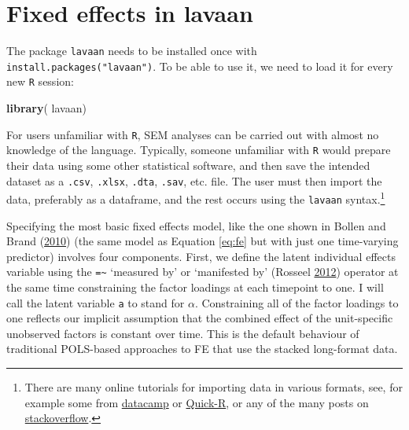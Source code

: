 \documentclass[
  12pt,
  a4paper]{article}
\newenvironment{Shaded}{\begin{snugshade}}{\end{snugshade}}
\newcommand{\KeywordTok}[1]{\textcolor[rgb]{0.13,0.29,0.53}{\textbf{#1}}}
\newcommand{\NormalTok}[1]{#1}
\begin{document}
\hypertarget{fesem}{%
\section{Fixed effects in lavaan}\label{fesem}}

The package \texttt{lavaan} needs to be installed once with
\texttt{install.packages("lavaan")}. To be able to use it, we need to
load it for every new \texttt{R} session:

\singlespacing

\begin{Shaded}
\begin{Highlighting}[]
\KeywordTok{library}\NormalTok{( lavaan)}
\end{Highlighting}
\end{Shaded}

\doublespacing

For users unfamiliar with \texttt{R}, SEM analyses can be carried out
with almost no knowledge of the language. Typically, someone unfamiliar
with \texttt{R} would prepare their data using some other statistical
software, and then save the intended dataset as a \texttt{.csv},
\texttt{.xlsx}, \texttt{.dta}, \texttt{.sav}, etc. file. The user must
then import the data, preferably as a dataframe, and the rest occurs
using the \texttt{lavaan} syntax.\footnote{There are many online
  tutorials for importing data in various formats, see, for example some
  from
  \href{https://www.datacamp.com/community/tutorials/r-data-import-tutorial}{datacamp}
  or
  \href{https://www.statmethods.net/input/importingdata.html}{Quick-R},
  or any of the many posts on
  \href{https://stackoverflow.com/search?q=r+import+data}{stackoverflow}.}

Specifying the most basic fixed effects model, like the one shown in
Bollen and Brand (\protect\hyperlink{ref-Bollen2010}{2010}) (the same
model as Equation \eqref{eq:fe} but with just one time-varying
predictor) involves four components. First, we define the latent
individual effects variable using the \texttt{=\textasciitilde{}}
`measured by' or `manifested by' (Rosseel
\protect\hyperlink{ref-R-lavaan}{2012}) operator at the same time
constraining the factor loadings at each timepoint to one. I will call
the latent variable \texttt{a} to stand for \(\alpha\). Constraining all
of the factor loadings to one reflects our implicit assumption that the
combined effect of the unit-specific unobserved factors is constant over
time. This is the default behaviour of traditional POLS-based approaches
to FE that use the stacked long-format data.
\end{document}
